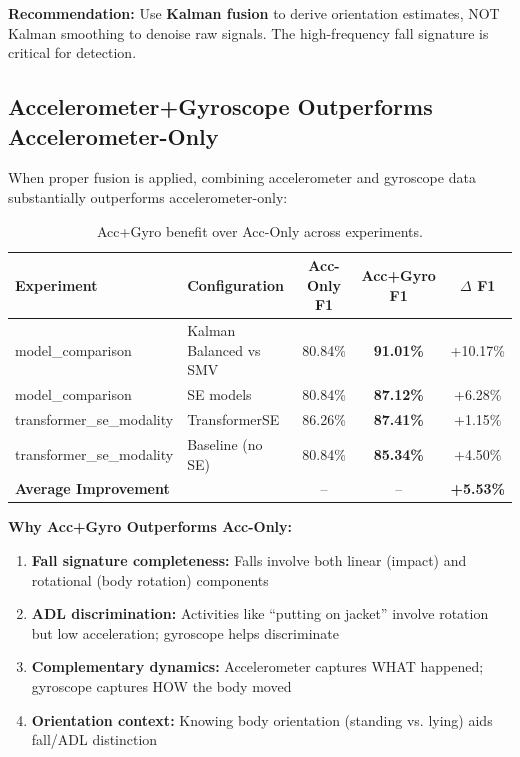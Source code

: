 \documentclass{article}
\begin{document}
\textbf{Recommendation:} Use \textbf{Kalman fusion} to derive orientation estimates, NOT Kalman smoothing to denoise raw signals. The high-frequency fall signature is critical for detection.

\subsection{Accelerometer+Gyroscope Outperforms Accelerometer-Only}

When proper fusion is applied, combining accelerometer and gyroscope data substantially outperforms accelerometer-only:

\begin{table}[htbp]
    \centering
    \caption{Acc+Gyro benefit over Acc-Only across experiments.}
    \label{tab:accgyro_evidence}
    \begin{tabular}{llccc}
        \toprule
        \textbf{Experiment} & \textbf{Configuration} & \textbf{Acc-Only F1} & \textbf{Acc+Gyro F1} & \textbf{$\Delta$ F1} \\
        \midrule
        model\_comparison & Kalman Balanced vs SMV & 80.84\% & \textbf{91.01\%} & +10.17\% \\
        model\_comparison & SE models & 80.84\% & \textbf{87.12\%} & +6.28\% \\
        transformer\_se\_modality & TransformerSE & 86.26\% & \textbf{87.41\%} & +1.15\% \\
        transformer\_se\_modality & Baseline (no SE) & 80.84\% & \textbf{85.34\%} & +4.50\% \\
        \midrule
        \multicolumn{2}{l}{\textbf{Average Improvement}} & -- & -- & \textbf{+5.53\%} \\
        \bottomrule
    \end{tabular}
\end{table}

\textbf{Why Acc+Gyro Outperforms Acc-Only:}
\begin{enumerate}
    \item \textbf{Fall signature completeness:} Falls involve both linear (impact) and rotational (body rotation) components
    \item \textbf{ADL discrimination:} Activities like ``putting on jacket'' involve rotation but low acceleration; gyroscope helps discriminate
    \item \textbf{Complementary dynamics:} Accelerometer captures WHAT happened; gyroscope captures HOW the body moved
    \item \textbf{Orientation context:} Knowing body orientation (standing vs. lying) aids fall/ADL distinction
\end{enumerate}
\end{document}
